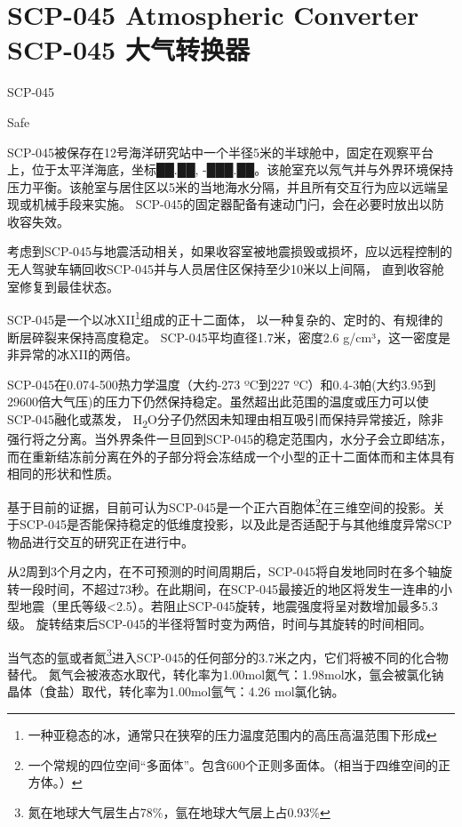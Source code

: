 \chapter[SCP-045 大气转换器]{
    SCP-045 Atmospheric Converter\\
    SCP-045 大气转换器
}

\label{chap:SCP-045}

SCP-045

Safe

SCP-045被保存在12号海洋研究站中一个半径5米的半球舱中，固定在观察平台上，位于太平洋海底，坐标██.██, -███.██。该舱室充以氖气并与外界环境保持压力平衡。该舱室与居住区以5米的当地海水分隔，并且所有交互行为应以远端呈现或机械手段来实施。 SCP-045的固定器配备有速动门闩，会在必要时放出以防收容失效。

考虑到SCP-045与地震活动相关，如果收容室被地震损毁或损坏，应以远程控制的无人驾驶车辆回收SCP-045并与人员居住区保持至少10米以上间隔， 直到收容舱室修复到最佳状态。

SCP-045是一个以冰XII\footnote{一种亚稳态的冰，通常只在狭窄的压力温度范围内的高压高温范围下形成}组成的正十二面体， 以一种复杂的、定时的、有规律的断层碎裂来保持高度稳定。 SCP-045平均直径1.7米，密度2.6 g\slash cm³，这一密度是非异常的冰XII的两倍。

SCP-045在0.074-500热力学温度（大约-273 ºC到227 ºC）和0.4-3帕(大约3.95到29600倍大气压)的压力下仍然保持稳定。虽然超出此范围的温度或压力可以使SCP-045融化或蒸发， H\textsubscript{2}O分子仍然因未知理由相互吸引而保持异常接近，除非强行将之分离。当外界条件一旦回到SCP-045的稳定范围内，水分子会立即结冻，而在重新结冻前分离在外的子部分将会冻结成一个小型的正十二面体而和主体具有相同的形状和性质。

基于目前的证据，目前可认为SCP-045是一个正六百胞体\footnote{一个常规的四位空间“多面体”。包含600个正则多面体。（相当于四维空间的正方体。）}在三维空间的投影。关于SCP-045是否能保持稳定的低维度投影，以及此是否适配于与其他维度异常SCP物品进行交互的研究正在进行中。

从2周到3个月之内，在不可预测的时间周期后，SCP-045将自发地同时在多个轴旋转一段时间，不超过73秒。在此期间，在SCP-045最接近的地区将发生一连串的小型地震（里氏等级<2.5）。若阻止SCP-045旋转，地震强度将呈对数增加最多5.3级。 旋转结束后SCP-045的半径将暂时变为两倍，时间与其旋转的时间相同。

当气态的氩或者氮\footnote{氮在地球大气层生占78\%，氩在地球大气层上占0.93\%}进入SCP-045的任何部分的3.7米之内，它们将被不同的化合物替代。 氮气会被液态水取代，转化率为1.00mol氮气：1.98mol水，氩会被氯化钠晶体（食盐）取代，转化率为1.00mol氩气：4.26 mol氯化钠。

